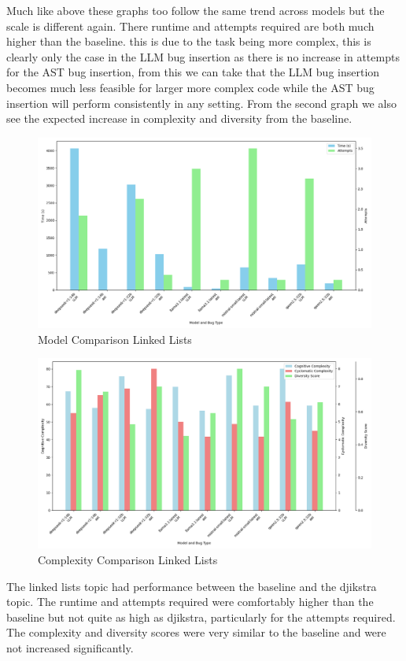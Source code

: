 \documentclass[12pt]{extarticle}
\begin{document}
Much like above these graphs too follow the same trend across models but the scale is different again. There runtime and attempts required are both much higher than the baseline. this is due to the task being more complex, this is clearly only the case in the LLM bug insertion as there is no increase in attempts for the AST bug insertion, from this we can take that the LLM bug insertion becomes much less feasible for larger more complex code while the AST bug insertion will perform consistently in any setting. From the second graph we also see the expected increase in complexity and diversity from the baseline.

\begin{figure}[h!]
\centering
\includegraphics[width=0.8\linewidth]{Images/Model_Comparison_Linked_Lists.png}
\caption{Model Comparison Linked Lists}
\label{fig:Model_Comparison_Linked_Lists}
\end{figure}

\begin{figure}[h!]
\centering
\includegraphics[width=0.8\linewidth]{Images/Complexity_Comparison_Linked_Lists.png}
\caption{Complexity Comparison Linked Lists}
\label{fig:Complexity_Comparison_Linked_Lists}
\end{figure}

The linked lists topic had performance between the baseline and the djikstra topic. The runtime and attempts required were comfortably higher than the baseline but not quite as high as djikstra, particularly for the attempts required. The complexity and diversity scores were very similar to the baseline and were not increased significantly. 
\end{document}
